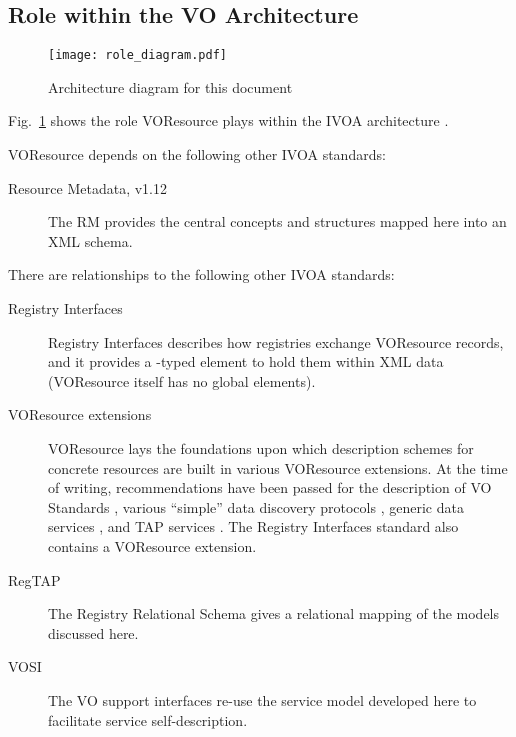 \documentclass[11pt,a4paper]{ivoa}
\begin{document}
\subsection{Role within the VO Architecture}
\label{sect:role}

\begin{figure}
\centering

\texttt{[image: role\_diagram.pdf]}
\caption{Architecture diagram for this document}
\label{fig:archdiag}
\end{figure}

Fig.~\ref{fig:archdiag} shows the role VOResource plays within the
IVOA architecture \citep{note:VOARCH}.

VOResource depends on the following other IVOA standards:

\begin{description}
\item[Resource Metadata, v1.12 \citep{2007ivoa.spec.0302H}] The RM
provides the central concepts and structures mapped here into an XML
schema.
\end{description}


There are relationships to the following other IVOA standards:

\begin{description}
\item[Registry Interfaces \citep{2009ivoa.spec.1104B}] Registry
Interfaces describes how registries exchange VOResource records, and it
provides a -typed element to hold them within XML
data (VOResource itself has no global elements).
\item[VOResource extensions] VOResource lays the foundations upon which
description schemes for concrete resources are built in various
VOResource extensions.  At the time of writing, recommendations have
been passed for the description of VO Standards
\citep{2012ivoa.spec.0508H}, various ``simple'' data discovery protocols
\citep{2013ivoa.spec.1125P}, generic data services
\citep{2010ivoa.spec.1202P}, and TAP services
\citep{2012ivoa.spec.0827D}.  The Registry Interfaces standard also
contains a VOResource extension.
\item[RegTAP \citep{2014ivoa.spec.1208D}] The Registry Relational Schema
gives a relational mapping of the models discussed here.
\item[VOSI \citep{2011ivoa.spec.0531G}] The VO support interfaces re-use
the service model developed here to facilitate service self-description.
\end{description}
\end{document}

